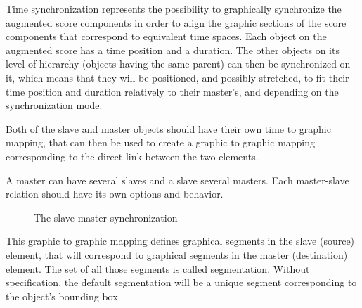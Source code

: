\documentclass[a4paper]{article}
\begin{document}
Time synchronization represents the possibility to graphically synchronize the augmented score components in order to align the graphic sections of the score components that correspond to equivalent time spaces. Each object on the augmented score has a time position and a duration. The other objects on its level of hierarchy (objects having the same parent) can then be synchronized on it, which means that they will be positioned, and possibly stretched, to fit their time position and duration relatively to their master's, and depending on the synchronization mode. 

Both of the slave and master objects should have their own time to graphic mapping, that can then be used to create a graphic to graphic mapping corresponding to the direct link between the two elements. 

A master can have several slaves and a slave several masters. Each master-slave relation should have its own options and behavior.


\begin{figure}[h]
\begin{center}


 \caption{The slave-master synchronization}
 \label{fig:sync}

\end{center}
\end{figure}

This graphic to graphic mapping defines graphical segments in the slave (source) element, that will correspond to graphical segments in the master (destination) element.
The set of all those segments is called segmentation. Without specification, the default segmentation will be a unique segment corresponding to the object's bounding box.
\end{document}

